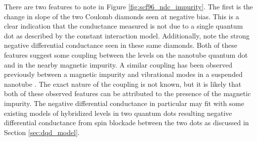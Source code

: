 There are two features to note in Figure \ref{fig:scf96_ndc_impurity}. The first is the change in slope of the two Coulomb diamonds seen at negative bias. This is a clear indication that the conductance measured is not due to a single quantum dot as described by the constant interaction model. Additionally, note the strong negative differential conductance seen in these same diamonds. Both of these features suggest some coupling between the levels on the nanotube quantum dot and in the nearby magnetic impurity. A similar coupling has been observed previously between a magnetic impurity and vibrational modes in a suspended nanotube \cite{Ganzhorn2013}. The exact nature of the coupling is not known, but it is likely that both of these observed features can be attributed to the presence of the magnetic impurity. The negative differential conductance in particular may fit with some existing models of hybridized levels in two quantum dots resulting negative differential conductance from spin blockade between the two dots as discussed in Section \ref{sec:dqd_model}.